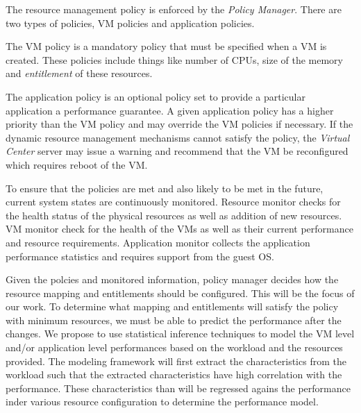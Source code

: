 The resource management policy is enforced by the \emph{Policy Manager}. 
There are two types of policies, VM policies and application policies. 

The VM policy is a mandatory policy that must be specified when a VM is created. 
These policies include things like number of CPUs, size of the memory and \emph{entitlement} of these resources. 

The application policy is an optional policy set to provide a particular application a performance guarantee. 
A given application policy has a higher priority than the VM policy and may override the VM policies if necessary. 
If the dynamic resource management mechanisms cannot satisfy the policy, the \emph{Virtual Center} server may issue a warning and recommend that the VM be reconfigured which requires reboot of the VM. 

To ensure that the policies are met and also likely to be met in the future, current system states are continuously monitored. 
Resource monitor checks for the health status of the physical resources as well as addition of new resources. 
VM monitor check for the health of the VMs as well as their current performance and resource requirements. 
Application monitor collects the application performance statistics and requires support from the guest OS. 

Given the polcies and monitored information, policy manager decides how the resource mapping and entitlements should be configured. 
This will be the focus of our work.
To determine what mapping and entitlements will satisfy the policy with minimum resources, we must be able to predict the performance after the changes. 
We propose to use statistical inference techniques to model the VM level and/or application level performances based on the workload and the resources provided. 
The modeling framework will first extract the characteristics from the workload such that the extracted characteristics have high correlation with the performance. 
These characteristics than will be regressed agains the performance inder various resource configuration to determine the performance model. 
